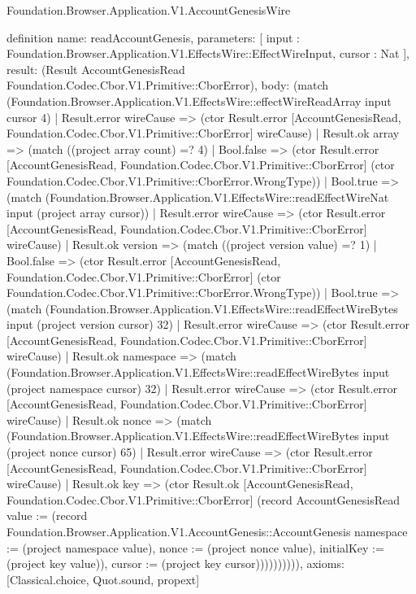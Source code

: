 \begin{lexlean}{Foundation.Browser.Application.V1.AccountGenesisWire}
\begin{semanticmodule}
definition{
  name: readAccountGenesis,
  parameters: [
    input : Foundation.Browser.Application.V1.EffectsWire::EffectWireInput,
    cursor : Nat
  ],
  result: (Result AccountGenesisRead Foundation.Codec.Cbor.V1.Primitive::CborError),
  body: (match (Foundation.Browser.Application.V1.EffectsWire::effectWireReadArray input cursor 4)
    | Result.error wireCause => (ctor Result.error [AccountGenesisRead, Foundation.Codec.Cbor.V1.Primitive::CborError] wireCause)
    | Result.ok array => (match ((project array count) =? 4)
      | Bool.false => (ctor Result.error [AccountGenesisRead, Foundation.Codec.Cbor.V1.Primitive::CborError] (ctor Foundation.Codec.Cbor.V1.Primitive::CborError.WrongType))
      | Bool.true => (match (Foundation.Browser.Application.V1.EffectsWire::readEffectWireNat input (project array cursor))
        | Result.error wireCause => (ctor Result.error [AccountGenesisRead, Foundation.Codec.Cbor.V1.Primitive::CborError] wireCause)
        | Result.ok version => (match ((project version value) =? 1)
          | Bool.false => (ctor Result.error [AccountGenesisRead, Foundation.Codec.Cbor.V1.Primitive::CborError] (ctor Foundation.Codec.Cbor.V1.Primitive::CborError.WrongType))
          | Bool.true => (match (Foundation.Browser.Application.V1.EffectsWire::readEffectWireBytes input (project version cursor) 32)
            | Result.error wireCause => (ctor Result.error [AccountGenesisRead, Foundation.Codec.Cbor.V1.Primitive::CborError] wireCause)
            | Result.ok namespace => (match (Foundation.Browser.Application.V1.EffectsWire::readEffectWireBytes input (project namespace cursor) 32)
              | Result.error wireCause => (ctor Result.error [AccountGenesisRead, Foundation.Codec.Cbor.V1.Primitive::CborError] wireCause)
              | Result.ok nonce => (match (Foundation.Browser.Application.V1.EffectsWire::readEffectWireBytes input (project nonce cursor) 65)
                | Result.error wireCause => (ctor Result.error [AccountGenesisRead, Foundation.Codec.Cbor.V1.Primitive::CborError] wireCause)
                | Result.ok key => (ctor Result.ok [AccountGenesisRead, Foundation.Codec.Cbor.V1.Primitive::CborError] (record AccountGenesisRead {value := (record Foundation.Browser.Application.V1.AccountGenesis::AccountGenesis {namespace := (project namespace value), nonce := (project nonce value), initialKey := (project key value)}), cursor := (project key cursor)}))))))))),
  axioms: [Classical.choice, Quot.sound, propext]
}


\end{semanticmodule}
\end{lexlean}
